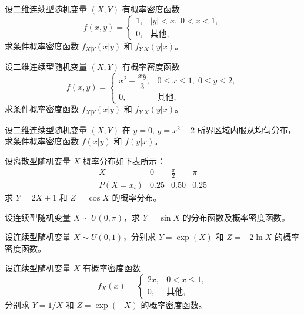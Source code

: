 \begin{homework}[2.38]
设二维连续型随机变量 $(X,Y)$ 有概率密度函数
\[
f(x,y) =
\begin{cases}
1, & |y| < x, \; 0 < x < 1, \\[6pt]
0, & \text{其他},
\end{cases}
\]
求条件概率密度函数 $f_{X|Y}(x|y)$ 和 $f_{Y|X}(y|x)$。
\end{homework}

\begin{homework}[2.39]
设二维连续型随机变量 $(X,Y)$ 有概率密度函数
\[
f(x,y) =
\begin{cases}
x^2 + \dfrac{xy}{3}, & 0 \leq x \leq 1, \; 0 \leq y \leq 2, \\[6pt]
0, & \text{其他},
\end{cases}
\]
求条件概率密度函数 $f_{X|Y}(x|y)$ 和 $f_{Y|X}(y|x)$。
\end{homework}

\begin{homework}[2.40]
设二维连续型随机变量 $(X,Y)$ 在 $y=0, \, y=x^2-2$ 所界区域内服从均匀分布，求条件概率密度函数 $f(x|y)$ 和 $f(y|x)$。
\end{homework}

\begin{homework}[2.41]
设离散型随机变量 $X$ 概率分布如下表所示：
\[
\begin{array}{c|ccc}
X & 0 & \tfrac{\pi}{2} & \pi \\ \hline
P(X= x_i) & 0.25 & 0.50 & 0.25
\end{array}
\]
求 $Y = 2X + 1$ 和 $Z = \cos X$ 的概率分布。
\end{homework}

\begin{homework}[2.42]
设连续型随机变量 $X \sim U(0,\pi)$，求 $Y = \sin X$ 的分布函数及概率密度函数。
\end{homework}

\begin{homework}[2.43]
设连续型随机变量 $X \sim U(0,1)$，分别求 $Y = \exp(X)$ 和 $Z = -2\ln X$ 的概率密度函数。
\end{homework}

\begin{homework}[2.44]
设连续型随机变量 $X$ 有概率密度函数
\[
f_X(x) =
\begin{cases}
2x, & 0 < x \leq 1, \\[6pt]
0, & \text{其他},
\end{cases}
\]
分别求 $Y = 1/X$ 和 $Z = \exp(-X)$ 的概率密度函数。
\end{homework}

